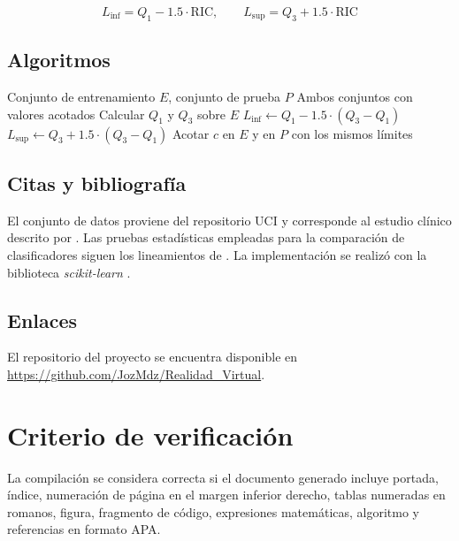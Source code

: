 \documentclass[11pt]{article}
\begin{document}
\[
L_{\text{inf}} = Q_1 - 1.5 \cdot \text{RIC},
\qquad
L_{\text{sup}} = Q_3 + 1.5 \cdot \text{RIC}
\]

\subsection{Algoritmos}

\begin{algorithm}[H]
\caption{Acotamiento de valores atípicos}
\label{alg:acotar}
\begin{algorithmic}[1]
\Require Conjunto de entrenamiento $E$, conjunto de prueba $P$
\Ensure Ambos conjuntos con valores acotados
    \State Calcular $Q_1$ y $Q_3$ sobre $E$
    \State $L_{\text{inf}} \gets Q_1 - 1.5 \cdot (Q_3 - Q_1)$
    \State $L_{\text{sup}} \gets Q_3 + 1.5 \cdot (Q_3 - Q_1)$
    \State Acotar $c$ en $E$ y en $P$ con los mismos límites
\EndFor
\end{algorithmic}
\end{algorithm}

\subsection{Citas y bibliografía}

El conjunto de datos proviene del repositorio UCI \parencite{support2} y corresponde al
estudio clínico descrito por \textcite{knaus1995support}. Las pruebas estadísticas empleadas
para la comparación de clasificadores siguen los lineamientos de \textcite{demsar2006}. La
implementación se realizó con la biblioteca \textit{scikit-learn} \parencite{scikit-learn}.

\subsection{Enlaces}

El repositorio del proyecto se encuentra disponible en
\url{https://github.com/JozMdz/Realidad_Virtual}.

\section{Criterio de verificación}

La compilación se considera correcta si el documento generado incluye portada, índice,
numeración de página en el margen inferior derecho, tablas numeradas en romanos, figura,
fragmento de código, expresiones matemáticas, algoritmo y referencias en formato APA.

\printbibliography[title={Referencias}]
\end{document}
